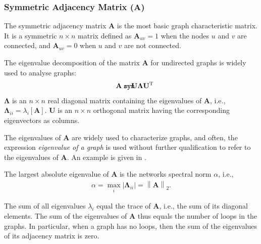 \documentclass{article}
\def\mathnote#1{%
  \tag*{\rlap{\hspace\marginparsep\smash{\parbox[t]{\marginparwidth}{#1}}}}
}
\begin{document}
\subsubsection{Symmetric Adjacency Matrix ($\mathbf A$)}
\label{sec:matrix.A}
The symmetric adjacency matrix $\mathbf A$ is the most basic graph
characteristic matrix.  It is a symmetric $n \times n$ matrix defined as
$\mathbf A_{uv}=1$ when the nodes $u$ and $v$ are connected, and
$\mathbf A_{uv}=0$ when $u$ and $v$ are not connected. 

The eigenvalue decomposition of the matrix $\mathbf A$ for undirected
graphs is widely used to analyse graphs: 
\begin{align}
  \mathnote{\texttt{sym}}
  \mathbf A &= \mathbf U \mathbf \Lambda \mathbf U^{\mathrm T}
\end{align}
$\mathbf \Lambda$ is an $n \times n$ real diagonal matrix containing the
eigenvalues of $\mathbf A$, i.e., $\mathbf \Lambda_{ii} =
\lambda_i[\mathbf A]$.  
$\mathbf U$ is an $n \times n$ orthogonal matrix having the
corresponding eigenvectors as columns. 

The eigenvalues of $\mathbf A$ are widely used to characterize graphs,
and often, the expression \emph{eigenvalue of a graph} is used without
further qualification to refer to the eigenvalues of $\mathbf A$.  An
example is given in \citep{b911}.

The largest absolute eigenvalue of $\mathbf A$ is the networks spectral
norm $\alpha$, i.e.,
\begin{align*}
  \alpha = \max_i |\mathbf \Lambda_{ii}| = \left\| \mathbf A \right\|_2.
\end{align*}

The sum of all eigenvalues $\lambda_i$ equal the trace of $\mathbf A$,
i.e., the sum of its diagonal elements.  The sum of the eigenvalues of
$\mathbf A$ thus equals the number of loops in the graphs. 
In particular, when a graph
has no loops, then the sum of the eigenvalues of its adjacency matrix is
zero.  
\end{document}
